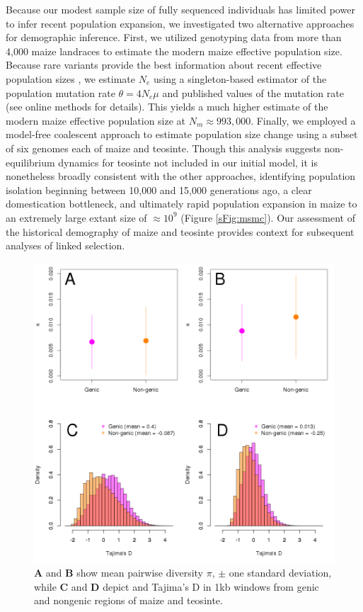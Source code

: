 \documentclass[12pt,a4paper]{article}
\begin{document}
Because our modest sample size of fully sequenced individuals has limited power to infer recent population expansion, we investigated two alternative approaches for demographic inference.  
First, we utilized genotyping data from more than 4,000 maize landraces \cite{Hearne2015} to estimate the modern maize effective population size.
Because rare variants provide the best information about recent effective population sizes \cite{keinan2012}, we estimate $N_e$ using  a singleton-based estimator \cite{fu1993} of the population mutation rate $\theta=4N_e\mu$  and published values of the mutation rate \cite{clark2005} (see online methods for details). 
This yields a much higher estimate of the modern maize effective population size at  $N_m \approx 993,000$.
Finally, we employed a model-free coalescent approach \cite{schiffels2014} to estimate population size change using a subset of six genomes each of maize and teosinte.
Though this analysis suggests non-equilibrium dynamics for teosinte not included in our initial model, it is nonetheless broadly consistent with the other approaches, identifying population isolation beginning between 10,000 and 15,000 generations ago, a clear domestication bottleneck, and ultimately rapid population expansion in maize to an extremely large extant size of $\approx 10^9$ (Figure \ref{sFig:msmc}).
Our assessment of the historical demography of maize and teosinte provides context for subsequent analyses of linked selection.


\begin{figure}[!tb]
  \begin{center}
  \includegraphics[width=.45\textwidth] {FigsAndFiles/Pi_and_Tajima.png}
\end{center}
\caption{\textbf{A} and \textbf{B} show mean pairwise diversity $\pi$, $\pm$ one standard deviation, while \textbf{C} and \textbf{D} depict and Tajima's D in 1kb windows from genic and nongenic regions of maize and teosinte.   \label{fig:diversity} }
\end{figure}
\end{document}
